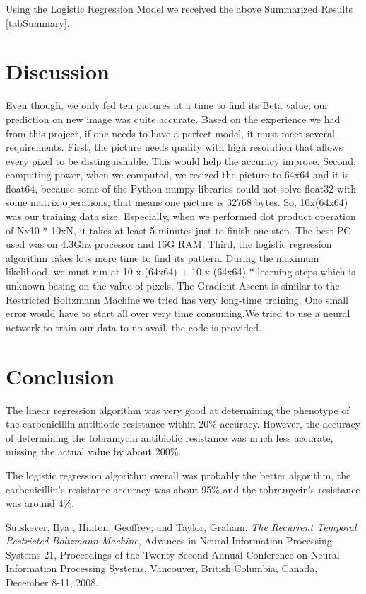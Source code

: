 \documentclass[conference]{IEEEtran}
\begin{document}
Using the Logistic Regression Model we received the above Summarized Results \ref{tabSummary}.

\section{Discussion}

Even though, we only fed ten pictures at a time to find its Beta value, our prediction on new image was quite accurate. Based on the experience we had from this project, if one needs to have a perfect model, it must meet several requirements. First, the picture needs quality with high resolution that allows every pixel to be distinguishable. This would help the accuracy improve. Second, computing power, when we computed, we resized the picture to 64x64 and it is float64, because some of the Python numpy libraries could not solve float32 with some matrix operations, that means one picture is 32768 bytes. So, 10x(64x64) was our training data size. Especially, when we performed dot product operation of Nx10 * 10xN, it takes at least 5 minutes just to finish one step. The best PC used was on 4.3Ghz processor and 16G RAM. Third, the logistic regression algorithm takes lots more time to find its pattern. During the maximum likelihood, we must run at 10 x (64x64) + 10 x (64x64) * learning steps which is unknown basing on the value of pixels. The Gradient Ascent is similar to the Restricted Boltzmann Machine we tried has very long-time training. One small error would have to start all over very time consuming.We tried to use a neural network to train our data to no avail, the code is provided.


\section{Conclusion}
The linear regression algorithm was very good at determining the phenotype of the carbenicillin antibiotic resistance within 20\% accuracy. However, the accuracy of determining the tobramycin antibiotic resistance was much less accurate, missing the actual value by about 200\%.

The logistic regression algorithm overall was probably the better algorithm, the carbenicillin's resistance accuracy was about 95\% and the tobramycin's resistance was around 4\%.


\begin{thebibliography}{1}

Sutskever, Ilya ,  Hinton, Geoffrey; and  Taylor, Graham.  \emph{The Recurrent Temporal Restricted Boltzmann Machine}, Advances in Neural Information Processing Systems 21, Proceedings of the Twenty-Second Annual Conference on Neural Information Processing Systems, Vancouver, British Columbia, Canada, December 8-11, 2008.


\end{thebibliography}
\end{document}

